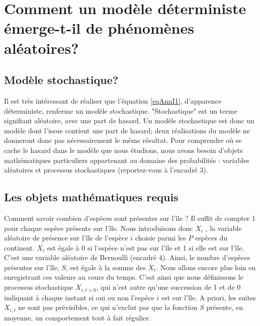 \section*{Comment un modèle déterministe émerge-t-il de phénomènes aléatoires?}

\subsection*{Modèle stochastique?}
Il est très intéressant de réaliser que l'équation \eqref{eqAnnI1}, d'apparence déterministe, renferme un modèle stochastique. "Stochastique" est un terme signifiant aléatoire, avec une part de hasard. Un modèle stochastique est donc un modèle dont l'issue contient une part de hasard; deux réalisations du modèle ne donneront donc pas nécessairement le même résultat. Pour comprendre où se cache le hasard dans le modèle que nous étudions, nous avons besoin d'objets mathématiques particuliers appartenant au domaine des probabilités : variables aléatoires et processus stochastiques (reportez-vous à l'encadré 3).

\subsection*{Les objets mathématiques requis}
Comment savoir combien d’espèces sont présentes sur l’île ? Il suffit de compter 1 pour chaque espèce présente sur l’île. Nous introduisons donc $X_i$ , la variable aléatoire de présence sur l’île de l’espèce $i$ choisie parmi les $P$ espèces du continent. $X_i$ est égale à 0 si l’espèce n’est pas sur l’île et 1 si elle est sur l’île. C’est une variable aléatoire de Bernoulli (encadré 4). Ainsi, le nombre d’espèces présentes sur l’île, $S$, est égale à la somme des $X_i$. Nous allons encore plus loin en enregistrant ces valeurs au cours du temps. C'est ainsi que nous définissons le processus stochastique $X_{i,t>0}$, qui n'est autre qu'une succession de 1 et de 0 indiquant à chaque instant si oui ou non l'espèce $i$ est sur l'île. A priori, les suites $X_{i,t}$ ne sont pas prévisibles, ce qui n’exclut pas que la fonction $S$ présente, en moyenne, un comportement tout à fait régulier.

